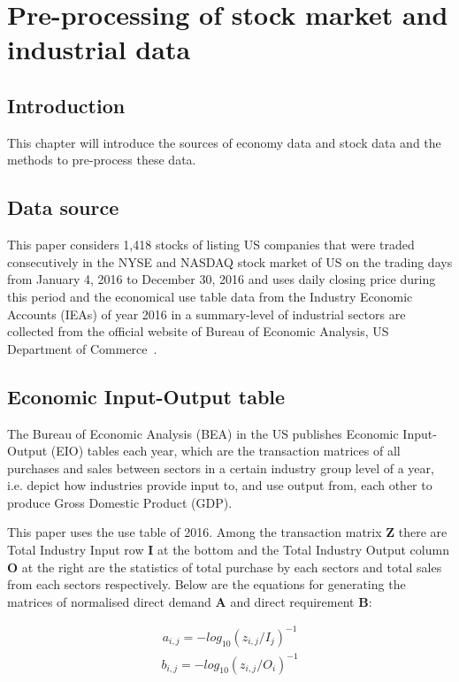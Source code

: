 \chapter[Pre-processing of data]{Pre-processing of stock market and industrial data}
\section{Introduction}
This chapter will introduce the sources of economy data and stock data and the methods to pre-process these data. 

\section{Data source}
This paper considers 1,418 stocks of listing US companies that were traded consecutively in the NYSE and NASDAQ stock market of US on the trading days from January 4, 2016 to December 30, 2016 and uses daily closing price during this period and the economical use table data from the Industry Economic Accounts (IEAs) of year 2016 in a summary-level of industrial sectors are collected from the official website of Bureau of Economic Analysis, US Department of Commerce~\cite{bea}.

\section{Economic Input-Output table}
The Bureau of Economic Analysis (BEA) in the US publishes Economic Input-Output (EIO) tables each year, which are the transaction matrices of all purchases and sales between sectors in a certain industry group level of a year, i.e. depict how industries provide input to, and use output from, each other to produce Gross Domestic Product (GDP).

This paper uses the use table of 2016. Among the transaction matrix \textbf{Z} there are Total Industry Input row \textbf{I} at the bottom and the Total Industry Output column \textbf{O} at the right are the statistics of total purchase by each sectors and total sales from each sectors respectively. Below are the equations for generating the matrices of normalised direct demand \textbf{A} and direct requirement \textbf{B}:

\begin{eqnarray}\label{equ:eio_i}
a_{i,j} = -log_{10}(z_{i,j} / I_j)^{-1}
\end{eqnarray}
\begin{eqnarray}\label{equ:eio_o}
b_{i,j} = -log_{10}(z_{i,j} / O_i)^{-1}
\end{eqnarray}

